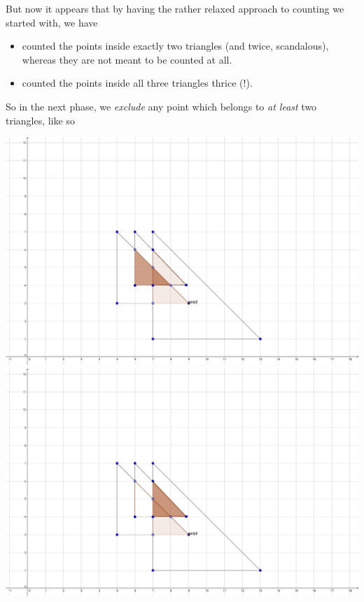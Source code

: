         But now it appears that by having the rather relaxed approach to counting we
        started with, we have
        \begin{itemize}
            \item counted the points inside exactly two triangles (and twice, scandalous),
            whereas they are not meant to be counted at all.
            \item counted the points inside all three triangles thrice (!).
        \end{itemize}

        So in the next phase, we \emph{exclude} any point which belongs to \emph{at least}
        two triangles, like so

        \begin{center}
            \includegraphics[scale=0.1]{images/color3.png}
            \includegraphics[scale=0.1]{images/color6.png}

\end{center}
